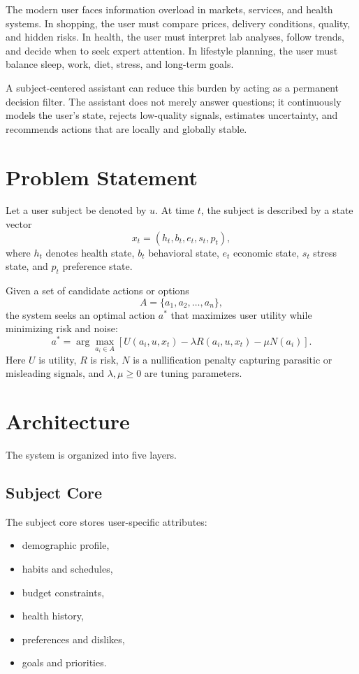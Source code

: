 \documentclass[11pt,a4paper]{article}
\begin{document}
The modern user faces information overload in markets, services, and health systems. In shopping, the user must compare prices, delivery conditions, quality, and hidden risks. In health, the user must interpret lab analyses, follow trends, and decide when to seek expert attention. In lifestyle planning, the user must balance sleep, work, diet, stress, and long-term goals.

A subject-centered assistant can reduce this burden by acting as a permanent decision filter. The assistant does not merely answer questions; it continuously models the user's state, rejects low-quality signals, estimates uncertainty, and recommends actions that are locally and globally stable.

\section{Problem Statement}

Let a user subject be denoted by $u$. At time $t$, the subject is described by a state vector
\[
x_t = (h_t, b_t, e_t, s_t, p_t),
\]
where $h_t$ denotes health state, $b_t$ behavioral state, $e_t$ economic state, $s_t$ stress state, and $p_t$ preference state.

Given a set of candidate actions or options
\[
A = \{a_1, a_2, \dots, a_n\},
\]
the system seeks an optimal action $a^*$ that maximizes user utility while minimizing risk and noise:
\[
a^* = \arg\max_{a_i \in A} \left[ U(a_i, u, x_t) - \lambda R(a_i, u, x_t) - \mu N(a_i) \right].
\]
Here $U$ is utility, $R$ is risk, $N$ is a nullification penalty capturing parasitic or misleading signals, and $\lambda, \mu \ge 0$ are tuning parameters.

\section{Architecture}

The system is organized into five layers.

\subsection{Subject Core}
The subject core stores user-specific attributes:
\begin{itemize}[leftmargin=1.2em]
    \item demographic profile,
    \item habits and schedules,
    \item budget constraints,
    \item health history,
    \item preferences and dislikes,
    \item goals and priorities.
\end{itemize}
\end{document}
